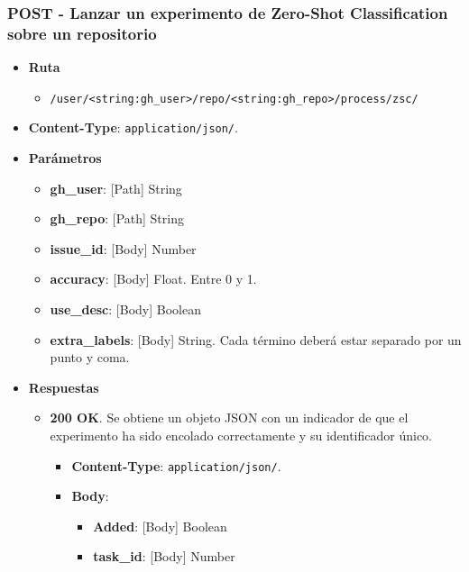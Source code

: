 \subsubsection{POST - Lanzar un experimento de Zero-Shot Classification sobre un repositorio}

\begin{itemize}
    \item[] \textbf{Ruta}
        \begin{itemize} \setlength\itemsep{0.2em}
            \item[] \texttt{/user/<string:gh\_user>/repo/<string:gh\_repo>/process/zsc/}
        \end{itemize}
    \item[] \textbf{Content-Type}: \texttt{application/json/}.
    \item[] \textbf{Parámetros}
        \begin{itemize} \setlength\itemsep{0.2em}
            \item[] \textbf{gh\_user}: [Path] String
            \item[] \textbf{gh\_repo}: [Path] String
            \item[] \textbf{issue\_id}: [Body] Number
            \item[] \textbf{accuracy}: [Body] Float. Entre 0 y 1.
            \item[] \textbf{use\_desc}: [Body] Boolean
            \item[] \textbf{extra\_labels}: [Body] String. Cada término deberá estar separado por un punto y coma.
        \end{itemize}
    \item[] \textbf{Respuestas}
        \begin{itemize} \setlength\itemsep{0.2em}
            \item[] \textbf{200 OK}. Se obtiene un objeto JSON con un indicador de que el experimento ha sido encolado correctamente y su identificador único.
                \begin{itemize} \setlength\itemsep{0.2em}
                    \item[] \textbf{Content-Type}: \texttt{application/json/}.
                    \item[] \textbf{Body}: 
                        \begin{itemize} \setlength\itemsep{0.2em}
                            \item[] \textbf{Added}: [Body] Boolean
                            \item[] \textbf{task\_id}: [Body] Number

\end{itemize}
\end{itemize}
\end{itemize}
\end{itemize}

